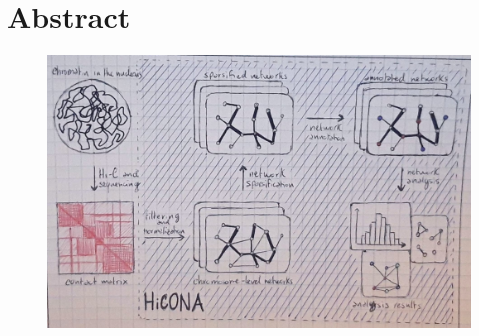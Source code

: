 \graphicspath{{chapters/01_abstract/images}}
\chapter*{Abstract}


\begin{figure}[h]
  \centering
  \includegraphics[width=1\textwidth]{graphical_abstract.jpeg}
\end{figure}

